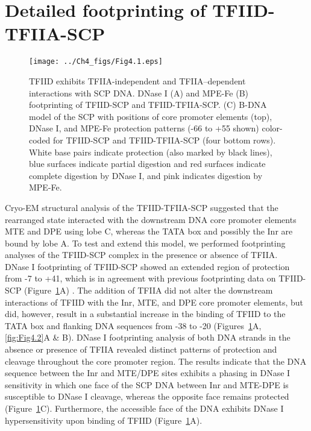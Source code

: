 \section{Detailed footprinting of TFIID-TFIIA-SCP}
\begin{figure}
\centering
\texttt{[image: ../Ch4\_figs/Fig4.1.eps]}
\caption[TFIID exhibits TFIIA-independent and TFIIA-dependent interactions with SCP DNA]{TFIID exhibits TFIIA-independent and TFIIA–dependent interactions with SCP DNA. DNase I (A) and MPE-Fe (B) footprinting of TFIID-SCP and TFIID-TFIIA-SCP. (C) B-DNA model of the SCP with positions of core promoter elements (top), DNase I, and MPE-Fe protection patterns (-66 to +55 shown) color-coded for TFIID-SCP and TFIID-TFIIA-SCP (four bottom rows).  White base pairs indicate protection (also marked by black lines), blue surfaces indicate partial digestion and red surfaces indicate complete digestion by DNase I, and pink indicates digestion by MPE-Fe.}
\label{fig:Fig4.1}
\end{figure}
Cryo-EM structural analysis of the TFIID-TFIIA-SCP suggested that the rearranged state interacted with the downstream DNA core promoter elements MTE and DPE using lobe C, whereas the TATA box and possibly the Inr are bound by lobe A. To test and extend this model, we performed footprinting analyses of the TFIID-SCP complex in the presence or absence of TFIIA.\\
\indent DNase I footprinting of TFIID-SCP showed an extended region of protection from -7 to +41, which is in agreement with previous footprinting data on TFIID-SCP (Figure~\ref{fig:Fig4.1}A) \cite{Juven-Gershon_1249}. The addition of TFIIA did not alter the downstream interactions of TFIID with the Inr, MTE, and DPE core promoter elements, but did, however, result in a substantial increase in the binding of TFIID to the TATA box and flanking DNA sequences from -38 to -20 (Figures~\ref{fig:Fig4.1}A, \ref{fig:Fig4.2}A \& B). DNase I footprinting analysis of both DNA strands in the absence or presence of TFIIA revealed distinct patterns of protection and cleavage throughout the core promoter region. The results indicate that the DNA sequence between the Inr and MTE/DPE sites exhibits a phasing in DNase I sensitivity in which one face of the SCP DNA between Inr and MTE-DPE is susceptible to DNase I cleavage, whereas the opposite face remains protected (Figure~\ref{fig:Fig4.1}C). Furthermore, the accessible face of the DNA exhibits DNase I hypersensitivity upon binding of TFIID (Figure~\ref{fig:Fig4.1}A). \\
